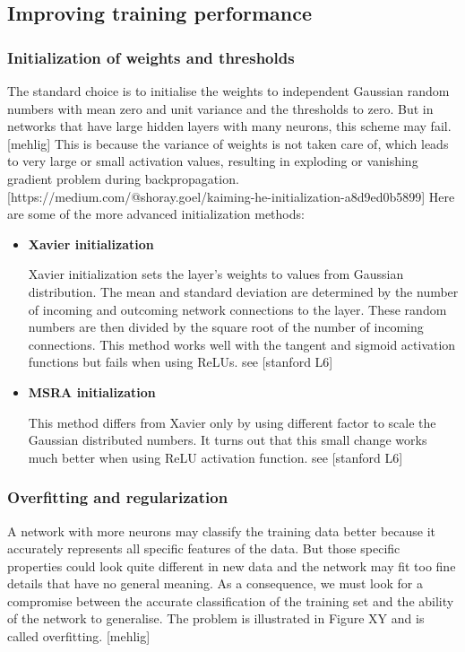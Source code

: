 \subsection{Improving training performance}
\subsubsection{Initialization of weights and thresholds}

The standard choice is to initialise the weights to independent Gaussian random numbers with mean zero and unit variance and the thresholds to zero. But in networks that have large hidden layers with many neurons, this scheme may fail. [mehlig] This is because the variance of weights is not taken care of, which leads to very large or small activation values, resulting in exploding or vanishing gradient problem during backpropagation. [https://medium.com/@shoray.goel/kaiming-he-initialization-a8d9ed0b5899] Here are some of the more advanced initialization methods:

\begin{itemize}
	\item \textbf{Xavier initialization}
		
	Xavier initialization sets the layer’s weights to values from Gaussian distribution. The mean and standard deviation are determined by the number of incoming and outcoming network connections to the layer. These random numbers are then divided by the square root of the number of incoming connections. This method works well with the tangent and sigmoid activation functions but fails when using ReLUs. see [stanford L6]	
	
	\item \textbf{MSRA initialization}

	This method differs from Xavier only by using different factor to scale the Gaussian distributed numbers. It turns out that this small change works much better when using ReLU activation function. see [stanford L6]
	
\end{itemize}

\subsubsection{Overfitting and regularization}
A network with more neurons may classify the training data better because it accurately represents all specific features of the data. But those specific properties could look quite different in new data and the network may fit too fine details that have no general meaning. As a consequence, we must look for a compromise between the accurate classification of the training set and the ability of the network to generalise. The problem is illustrated in Figure XY and is called overfitting. [mehlig]

